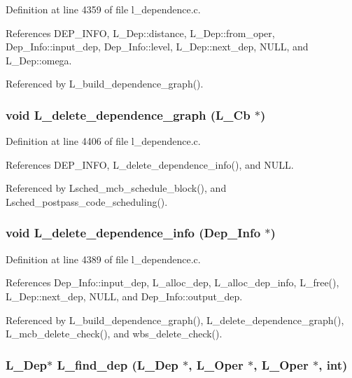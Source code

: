 Definition at line 4359 of file l\_\-dependence.c.

References DEP\_\-INFO, L\_\-Dep::distance, L\_\-Dep::from\_\-oper, Dep\_\-Info::input\_\-dep, Dep\_\-Info::level, L\_\-Dep::next\_\-dep, NULL, and L\_\-Dep::omega.

Referenced by L\_\-build\_\-dependence\_\-graph().
\subsubsection{\setlength{\rightskip}{0pt plus 5cm}void L\_\-delete\_\-dependence\_\-graph (L\_\-Cb $\ast$)}\label{l__dependence_8h_c5adb5f0283fd2a872096d4fe80b8048}




Definition at line 4406 of file l\_\-dependence.c.

References DEP\_\-INFO, L\_\-delete\_\-dependence\_\-info(), and NULL.

Referenced by Lsched\_\-mcb\_\-schedule\_\-block(), and Lsched\_\-postpass\_\-code\_\-scheduling().
\subsubsection{\setlength{\rightskip}{0pt plus 5cm}void L\_\-delete\_\-dependence\_\-info (\bf{Dep\_\-Info} $\ast$)}\label{l__dependence_8h_42fab7fffd27cd1352a69e066dda806c}




Definition at line 4389 of file l\_\-dependence.c.

References Dep\_\-Info::input\_\-dep, L\_\-alloc\_\-dep, L\_\-alloc\_\-dep\_\-info, L\_\-free(), L\_\-Dep::next\_\-dep, NULL, and Dep\_\-Info::output\_\-dep.

Referenced by L\_\-build\_\-dependence\_\-graph(), L\_\-delete\_\-dependence\_\-graph(), L\_\-mcb\_\-delete\_\-check(), and wbs\_\-delete\_\-check().
\subsubsection{\setlength{\rightskip}{0pt plus 5cm}\bf{L\_\-Dep}$\ast$ L\_\-find\_\-dep (\bf{L\_\-Dep} $\ast$, L\_\-Oper $\ast$, L\_\-Oper $\ast$, int)}\label{l__dependence_8h_d7f6a5b7e3b7e65cbb74b1ef97f2df49}




